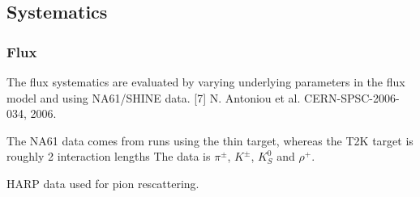 
\subsection{Systematics}


\subsubsection{Flux}
\label{subsec:ND280:syst:det}
The flux systematics are evaluated by varying underlying parameters in the flux model and using NA61/SHINE  data. [7] N. Antoniou et al. CERN-SPSC-2006-034, 2006.

The NA61 data comes from runs using the thin target, whereas the T2K target is roughly 2 interaction lengths The data is $\pi^\pm$, $K^\pm$, $K^0_S$ and $\rho^+$.

HARP data used for pion rescattering.

